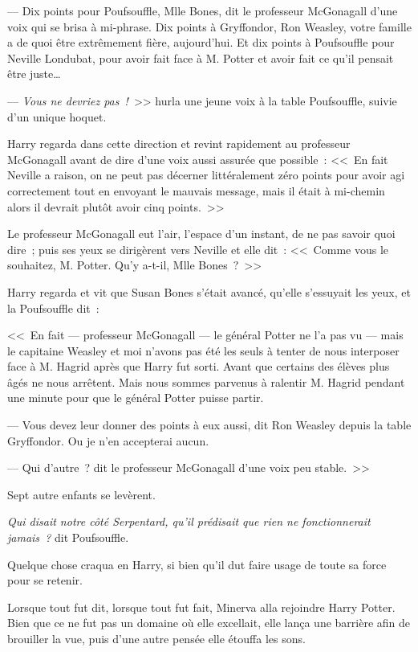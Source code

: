 --- Dix points pour Poufsouffle, Mlle Bones, dit le professeur McGonagall d'une voix qui se brisa à mi-phrase. Dix points à Gryffondor, Ron Weasley, votre famille a de quoi être extrêmement fière, aujourd'hui. Et dix points à Poufsouffle pour Neville Londubat, pour avoir fait face à M. Potter et avoir fait ce qu'il pensait être juste…

--- \emph{Vous ne devriez pas~!}~>> hurla une jeune voix à la table Poufsouffle, suivie d'un unique hoquet.

Harry regarda dans cette direction et revint rapidement au professeur McGonagall avant de dire d'une voix aussi assurée que possible~: <<~En fait Neville a raison, on ne peut pas décerner littéralement zéro points pour avoir agi correctement tout en envoyant le mauvais message, mais il était à mi-chemin alors il devrait plutôt avoir cinq points.~>>

Le professeur McGonagall eut l'air, l'espace d'un instant, de ne pas savoir quoi dire~; puis ses yeux se dirigèrent vers Neville et elle dit~: <<~Comme vous le souhaitez, M. Potter. Qu'y a-t-il, Mlle Bones~?~>>

Harry regarda et vit que Susan Bones s'était avancé, qu'elle s'essuyait les yeux, et la Poufsouffle dit~:

<<~En fait — professeur McGonagall — le général Potter ne l'a pas vu — mais le capitaine Weasley et moi n'avons pas été les seuls à tenter de nous interposer face à M. Hagrid après que Harry fut sorti. Avant que certains des élèves plus âgés ne nous arrêtent. Mais nous sommes parvenus à ralentir M. Hagrid pendant une minute pour que le général Potter puisse partir.

--- Vous devez leur donner des points à eux aussi, dit Ron Weasley depuis la table Gryffondor. Ou je n'en accepterai aucun.

--- Qui d'autre~? dit le professeur McGonagall d'une voix peu stable.~>>

Sept autre enfants se levèrent.

\emph{Qui disait notre côté Serpentard, qu'il prédisait que rien ne fonctionnerait jamais~?} dit Poufsouffle.

Quelque chose craqua en Harry, si bien qu'il dut faire usage de toute sa force pour se retenir.

\later

Lorsque tout fut dit, lorsque tout fut fait, Minerva alla rejoindre Harry Potter. Bien que ce ne fut pas un domaine où elle excellait, elle lança une barrière afin de brouiller la vue, puis d'une autre pensée elle étouffa les sons.

